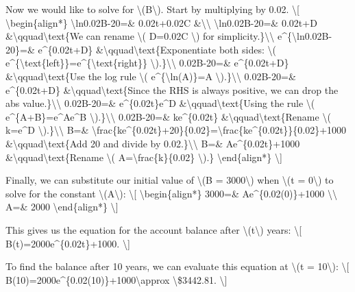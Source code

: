 Now we would like to solve for \textbackslash{}(B\textbackslash{}).
Start by multiplying by 0.02. \textbackslash{}{[}
\textbackslash{}begin\{align*\}
\textbackslash{}ln\textbar{}0.02B-20\textbar{}=\& 0.02t+0.02C
\&\textbackslash{}\textbackslash{}
\textbackslash{}ln\textbar{}0.02B-20\textbar{}=\& 0.02t+D
\&\textbackslash{}qquad\textbackslash{}text\{We can rename
\textbackslash{}( D=0.02C \textbackslash{}) for
simplicity.\}\textbackslash{}\textbackslash{}
e\^{}\{\textbackslash{}ln\textbar{}0.02B-20\textbar{}\}=\&
e\^{}\{0.02t+D\}
\&\textbackslash{}qquad\textbackslash{}text\{Exponentiate both sides:
\textbackslash{}(
e\^{}\{\textbackslash{}text\{left\}\}=e\^{}\{\textbackslash{}text\{right\}\}
\textbackslash{}).\}\textbackslash{}\textbackslash{}
\textbar{}0.02B-20\textbar{}=\& e\^{}\{0.02t+D\}
\&\textbackslash{}qquad\textbackslash{}text\{Use the log rule
\textbackslash{}( e\^{}\{\textbackslash{}ln(A)\}=A
\textbackslash{}).\}\textbackslash{}\textbackslash{} 0.02B-20=\&
e\^{}\{0.02t+D\} \&\textbackslash{}qquad\textbackslash{}text\{Since the
RHS is always positive, we can drop the abs
value.\}\textbackslash{}\textbackslash{} 0.02B-20=\&
e\^{}\{0.02t\}e\^{}D \&\textbackslash{}qquad\textbackslash{}text\{Using
the rule \textbackslash{}( e\^{}\{A+B\}=e\^{}Ae\^{}B
\textbackslash{}).\}\textbackslash{}\textbackslash{} 0.02B-20=\&
ke\^{}\{0.02t\} \&\textbackslash{}qquad\textbackslash{}text\{Rename
\textbackslash{}( k=e\^{}D
\textbackslash{}).\}\textbackslash{}\textbackslash{} B=\&
\textbackslash{}frac\{ke\^{}\{0.02t\}+20\}\{0.02\}=\textbackslash{}frac\{ke\^{}\{0.02t\}\}\{0.02\}+1000
\&\textbackslash{}qquad\textbackslash{}text\{Add 20 and divide by
0.02.\}\textbackslash{}\textbackslash{} B=\& Ae\^{}\{0.02t\}+1000
\&\textbackslash{}qquad\textbackslash{}text\{Rename \textbackslash{}(
A=\textbackslash{}frac\{k\}\{0.02\} \textbackslash{}).\}
\textbackslash{}end\{align*\} \textbackslash{}{]}

Finally, we can substitute our initial value of \textbackslash{}(B =
3000\textbackslash{}) when \textbackslash{}(t = 0\textbackslash{}) to
solve for the constant \textbackslash{}(A\textbackslash{}):
\textbackslash{}{[} \textbackslash{}begin\{align*\} 3000=\&
Ae\^{}\{0.02(0)\}+1000 \textbackslash{}\textbackslash{} A=\& 2000
\textbackslash{}end\{align*\} \textbackslash{}{]}

This gives us the equation for the account balance after
\textbackslash{}(t\textbackslash{}) years: \textbackslash{}{[}
B(t)=2000e\^{}\{0.02t\}+1000. \textbackslash{}{]}

To find the balance after 10 years, we can evaluate this equation at
\textbackslash{}(t = 10\textbackslash{}): \textbackslash{}{[}
B(10)=2000e\^{}\{0.02(10)\}+1000\textbackslash{}approx
\textbackslash{}\$3442.81. \textbackslash{}{]}

